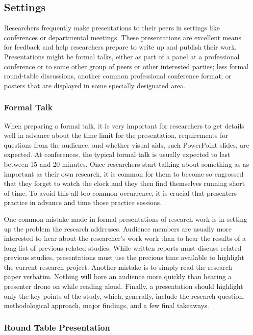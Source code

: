 \subsection{Settings}

Researchers frequently make presentations to their peers in settings like conferences or departmental meetings. These presentations are excellent means for feedback and help researchers prepare to write up and publish their work. Presentations might be formal talks, either as part of a panel at a professional conference or to some other group of peers or other interested parties; less formal round-table discussions, another common professional conference format; or posters that are displayed in some specially designated area.

\subsubsection{Formal Talk}

When preparing a formal talk, it is very important for researchers to get details well in advance about the time limit for the presentation, requirements for questions from the audience, and whether visual aids, such PowerPoint slides, are expected. At conferences, the typical formal talk is usually expected to last between 15 and 20 minutes. Once researchers start talking about something as as important as their own research, it is common for them to become so engrossed that they forget to watch the clock and they then find themselves running short of time. To avoid this all-too-common occurrence, it is crucial that presenters practice in advance and time those practice sessions.

One common mistake made in formal presentations of research work is in setting up the problem the research addresses. Audience members are usually more interested to hear about the researcher's work work than to hear the results of a long list of previous related studies. While written reports must discuss related previous studies, presentations must use the precious time available to highlight the current research project. Another mistake is to simply read the research paper verbatim. Nothing will bore an audience more quickly than hearing a presenter drone on while reading aloud. Finally, a presentation should highlight only the key points of the study, which, generally, include the research question, methodological approach, major findings, and a few final takeaways.

\subsubsection{Round Table Presentation}

